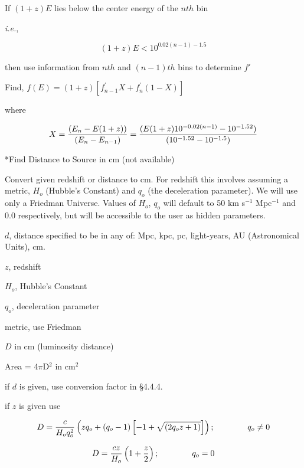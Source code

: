 {\list
 
If $(1+z)E$ lies below the center energy of the $nth$ bin
 
{\it i.e.},

}

$$(1+z)E <10^{0.02(n-1)-1.5}$$

{\list

then use information from $nth$ and $(n-1)th$ bins to determine $f'$
 
Find, $f(E) = (1 + z) \left[ f^{\prime}_{n-1} X + f^{\prime}_{n}(1-X) \right]$

where

}

$$X = {(E_{n}-E(1+z))\over (E_{n}-E_{n-1})} = {(E(1+z)10^{-0.02(n-1)}-10^{-1.52})\over (10^{-1.52}-10^{-1.5})}$$

 
\**Find Distance to Source in cm (not available)

{\list


Convert given redshift or distance to cm. For redshift this
involves assuming a metric, $H_o$ (Hubble's Constant) and $q_o$
(the deceleration parameter).  We will use only a Friedman Universe.
Values of $H_o$, $q_o$ will default to 50 km s$^{-1}$ Mpc$^{-1}$ and 0.0
respectively, but will be accessible to the user as hidden parameters.
 

$d$, distance specified to be in any of:  Mpc, kpc, pc, light-years,
AU (Astronomical Units), cm.
 
$z$, redshift
 
$H_o$, Hubble's Constant
 
$q_o$, deceleration parameter
 
metric, use Friedman
 

$D$ in cm (luminosity distance)
 
Area = 4$\pi$D$^{2}$ in cm$^{2}$
 

if $d$ is given, use conversion factor in \S4.4.4.

if $z$ is given use 
 
}

$$D = {c\over H_o q_o^2} \left( z q_o + (q_o-1) 
\left[-1+\sqrt{(2q_o z+1)} \right] \right);\qquad\qquad q_o \neq 0$$

$$D = {c z \over H_o} \left( 1 + { z \over 2} \right); \qquad\qquad
q_o = 0$$

